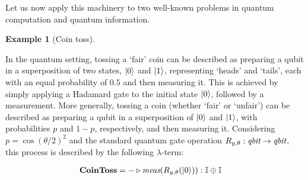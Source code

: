 \documentclass[10pt,a4paper]{amsart}
\theoremstyle{definition}
\theoremstyle{definition}
\newtheorem{example}[definition]{Example}
\theoremstyle{definition}
\theoremstyle{definition}
\theoremstyle{definition}
\theoremstyle{definition}
\begin{document}
Let us now apply this machinery to two well-known problems in quantum computation
and quantum information.

\begin{example}[Coin toss] \label{ex:coin_toss_syntax}



In the quantum setting, tossing a `fair' coin can be described as preparing a qubit in a superposition of two states, $\ket{0}$ and $\ket{1}$, representing `heads' and `tails', each with an equal probability of $0.5$ and then measuring it. This is achieved by simply applying a Hadamard gate to the initial state $\ket{0}$, followed by a measurement.
More generally, tossing a coin (whether `fair' or `unfair') can be described as preparing a qubit in a superposition of  $\ket{0}$ and $\ket{1}$, with probabilities $p$ and $1-p$, respectively,  and then measuring it.  Considering $p= \cos(\theta/2)^2$ and the standard quantum gate operation $R_{y,\theta} : \emph{qbit} \to \emph{qbit}$,  this process is described by the following $\lambda$-term:

\begin{align*}
  &\textbf{CoinToss} = - \triangleright \emph{meas} (R_{y,\theta} (\ket{0})): \mathbb{I} \oplus \mathbb{I}
\end{align*}


\end{example}
\end{document}
